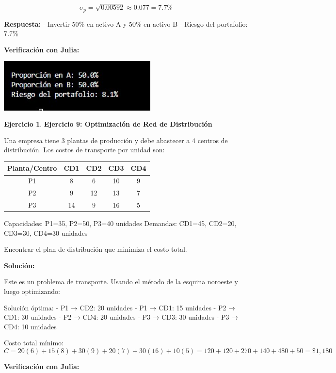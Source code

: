 \documentclass[12pt, a4paper, oneside]{book}
\theoremstyle{definition}
\newtheorem{ejercicio}{Ejercicio}[chapter]
\begin{document}
$$\sigma_p = \sqrt{0.00592} \approx 0.077 = 7.7\%$$

\textbf{Respuesta:}
- Invertir 50\% en activo A y 50\% en activo B
- Riesgo del portafolio: 7.7\%

\textbf{Verificación con Julia:}


\begin{center}
\includegraphics[width=0.6\textwidth]{ejercicio8fm.png}
\end{center}

\begin{ejercicio}
\textbf{Ejercicio 9: Optimización de Red de Distribución}

Una empresa tiene 3 plantas de producción y debe abastecer a 4 centros de distribución. Los costos de transporte por unidad son:

\begin{center}
\begin{tabular}{|c|cccc|}
\hline
Planta/Centro & CD1 & CD2 & CD3 & CD4 \\
\hline
P1 & 8 & 6 & 10 & 9 \\
P2 & 9 & 12 & 13 & 7 \\
P3 & 14 & 9 & 16 & 5 \\
\hline
\end{tabular}
\end{center}

Capacidades: P1=35, P2=50, P3=40 unidades
Demandas: CD1=45, CD2=20, CD3=30, CD4=30 unidades

Encontrar el plan de distribución que minimiza el costo total.
\end{ejercicio}

\textbf{Solución:}

Este es un problema de transporte. Usando el método de la esquina noroeste y luego optimizando:

Solución óptima:
- P1 → CD2: 20 unidades
- P1 → CD1: 15 unidades  
- P2 → CD1: 30 unidades
- P2 → CD4: 20 unidades
- P3 → CD3: 30 unidades
- P3 → CD4: 10 unidades

Costo total mínimo:
$$C = 20(6) + 15(8) + 30(9) + 20(7) + 30(16) + 10(5) = 120 + 120 + 270 + 140 + 480 + 50 = \$1,180$$

\textbf{Verificación con Julia:}
\end{document}
